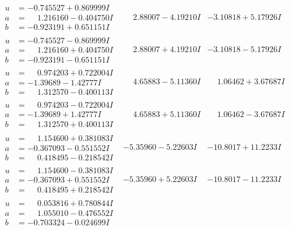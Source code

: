 \documentclass[1p]{elsarticle_modified}
\theoremstyle{definition}
\begin{document}
$$\begin{array}{c|c|c}
\begin{aligned}
u &= -0.745527 + 0.869999 I \\
a &= \phantom{-}1.216160 - 0.404750 I \\
b &= -0.923191 + 0.651151 I\end{aligned}
 & \phantom{-}2.88007 - 4.19210 I & -3.10818 + 5.17926 I \\ \hline\begin{aligned}
u &= -0.745527 - 0.869999 I \\
a &= \phantom{-}1.216160 + 0.404750 I \\
b &= -0.923191 - 0.651151 I\end{aligned}
 & \phantom{-}2.88007 + 4.19210 I & -3.10818 - 5.17926 I \\ \hline\begin{aligned}
u &= \phantom{-}0.974203 + 0.722004 I \\
a &= -1.39689 - 1.42777 I \\
b &= \phantom{-}1.312570 - 0.400113 I\end{aligned}
 & \phantom{-}4.65883 - 5.11360 I & \phantom{-}1.06462 + 3.67687 I \\ \hline\begin{aligned}
u &= \phantom{-}0.974203 - 0.722004 I \\
a &= -1.39689 + 1.42777 I \\
b &= \phantom{-}1.312570 + 0.400113 I\end{aligned}
 & \phantom{-}4.65883 + 5.11360 I & \phantom{-}1.06462 - 3.67687 I \\ \hline\begin{aligned}
u &= \phantom{-}1.154600 + 0.381083 I \\
a &= -0.367093 - 0.551552 I \\
b &= \phantom{-}0.418495 - 0.218542 I\end{aligned}
 & -5.35960 - 5.22603 I & -10.8017 + 11.2233 I \\ \hline\begin{aligned}
u &= \phantom{-}1.154600 - 0.381083 I \\
a &= -0.367093 + 0.551552 I \\
b &= \phantom{-}0.418495 + 0.218542 I\end{aligned}
 & -5.35960 + 5.22603 I & -10.8017 - 11.2233 I \\ \hline\begin{aligned}
u &= \phantom{-}0.053816 + 0.780844 I \\
a &= \phantom{-}1.055010 - 0.476552 I \\
b &= -0.703324 - 0.024699 I\end{aligned}

\end{array}$$
\end{document}
